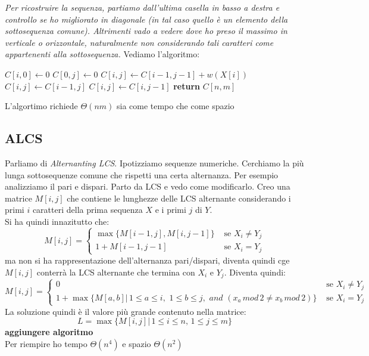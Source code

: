 \documentclass[a4paper,12pt, oneside]{book}
\begin{document}
\textit{Per ricostruire la sequenza, partiamo dall’ultima casella in
  basso a destra e controllo se ho migliorato in diagonale (in tal
  caso quello è un elemento della sottosequenza comune). Altrimenti
  vado a vedere dove ho preso il massimo in verticale o orizzontale,
  naturalmente non considerando tali caratteri come appartenenti alla
  sottosequenza.}
\newpage
Vediamo l'algoritmo:
\begin{algorithm}
  \begin{algorithmic}
    \State $C[i,0]\gets 0$
    \EndFor
    \State $C[0,j]\gets 0$
    \EndFor
    \State $C[i,j]\gets C[i-1,j-1]+w(X[i])$
    \Else
    \State $C[i,j]\gets C[i-1,j]$
    \State $C[i,j]\gets C[i, j-1]$
    \EndIf
    \EndIf
    \EndFor
    \EndFor
    \State \textbf{return} $C[n,m]$
    \EndFunction
  \end{algorithmic}
\end{algorithm}
L'algortimo richiede $\Theta(nm)$ sia come tempo che come spazio
\subsection{ALCS}
Parliamo di \textit{Alternanting LCS}. Ipotizziamo sequenze
numeriche. Cerchiamo la più lunga sottosequenze comune che rispetti
una certa alternanza. Per esempio analizziamo il pari e dispari.
Parto da LCS e vedo come modificarlo. Creo una matrice $M[i,j]$ che
contiene le lunghezze delle LCS alternante considerando i primi $i$
caratteri della prima sequenza $X$ e i primi $j$ di $Y$.\\
Si ha quindi innazitutto che:
\[ M[i,j]=
  \begin{cases}
    \max\{M[i-1,j], M[i,j-1]\} & \mbox{ se } X_i\neq Y_j\\
    1+M[i-1,j-1] & \mbox{ se } X_i=Y_j
  \end{cases}
\]
ma non si ha rappresentazione dell'alternanza pari/dispari, diventa
quindi cge $M[i,j]$ conterrà la LCS alternante che termina con  $X_i$
e $Y_j$. Diventa quindi:
\[ M[i,j]=
  \begin{cases}
    0 & \mbox{ se } X_i\neq Y_j\\
    1+\max\{M[a,b]|\, 1\leq a \leq i,\,\,1\leq b\leq j,\,\,and\,\,
    (x_a\,mod\, 2 \neq x_b\,mod\, 2)\} & \mbox{ se } X_i=Y_j
  \end{cases}
\]
La soluzione quindi è il valore più grande contenuto nella matrice:
\[L=\max\{M[i,j]|\,1\leq i\leq n,\, 1\leq j\leq m\}\]
\textbf{aggiungere algoritmo}\\
Per riempire ho tempo $\Theta(n^4)$ e spazio $\Theta(n^2)$
\end{document}
